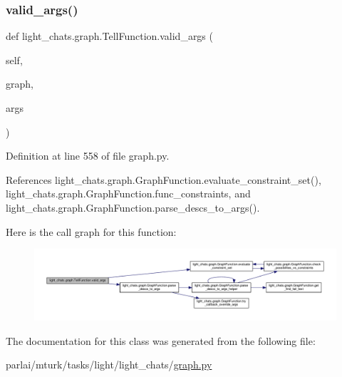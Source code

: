 \subsubsection{\texorpdfstring{valid\+\_\+args()}{valid\_args()}}
{\footnotesize\ttfamily def light\+\_\+chats.\+graph.\+Tell\+Function.\+valid\+\_\+args (\begin{DoxyParamCaption}\item[{}]{self,  }\item[{}]{graph,  }\item[{}]{args }\end{DoxyParamCaption})}



Definition at line 558 of file graph.\+py.



References light\+\_\+chats.\+graph.\+Graph\+Function.\+evaluate\+\_\+constraint\+\_\+set(), light\+\_\+chats.\+graph.\+Graph\+Function.\+func\+\_\+constraints, and light\+\_\+chats.\+graph.\+Graph\+Function.\+parse\+\_\+descs\+\_\+to\+\_\+args().

Here is the call graph for this function\+:
\nopagebreak
\begin{figure}[H]
\begin{center}
\leavevmode
\includegraphics[width=350pt]{classlight__chats_1_1graph_1_1TellFunction_a86e8534217b3d10cb4daf5cc080d624e_cgraph}
\end{center}
\end{figure}


The documentation for this class was generated from the following file\+:\begin{DoxyCompactItemize}
\item 
parlai/mturk/tasks/light/light\+\_\+chats/\hyperlink{parlai_2mturk_2tasks_2light_2light__chats_2graph_8py}{graph.\+py}\end{DoxyCompactItemize}
